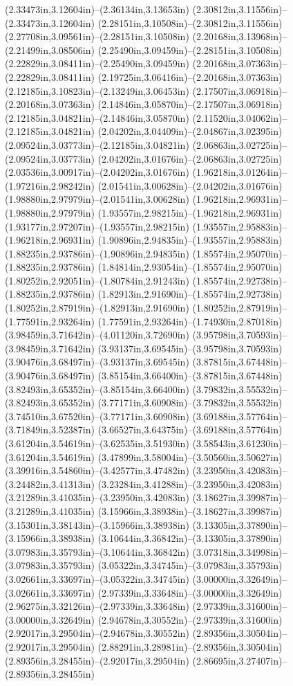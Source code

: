 (2.33473in,3.12604in)--(2.36134in,3.13653in) (2.30812in,3.11556in)--(2.33473in,3.12604in) (2.28151in,3.10508in)--(2.30812in,3.11556in) (2.27708in,3.09561in)--(2.28151in,3.10508in) (2.20168in,3.13968in)--(2.21499in,3.08506in) (2.25490in,3.09459in)--(2.28151in,3.10508in) (2.22829in,3.08411in)--(2.25490in,3.09459in) (2.20168in,3.07363in)--(2.22829in,3.08411in) (2.19725in,3.06416in)--(2.20168in,3.07363in) (2.12185in,3.10823in)--(2.13249in,3.06453in) (2.17507in,3.06918in)--(2.20168in,3.07363in) (2.14846in,3.05870in)--(2.17507in,3.06918in) (2.12185in,3.04821in)--(2.14846in,3.05870in) (2.11520in,3.04062in)--(2.12185in,3.04821in) (2.04202in,3.04409in)--(2.04867in,3.02395in) (2.09524in,3.03773in)--(2.12185in,3.04821in) (2.06863in,3.02725in)--(2.09524in,3.03773in) (2.04202in,3.01676in)--(2.06863in,3.02725in) (2.03536in,3.00917in)--(2.04202in,3.01676in) (1.96218in,3.01264in)--(1.97216in,2.98242in) (2.01541in,3.00628in)--(2.04202in,3.01676in) (1.98880in,2.97979in)--(2.01541in,3.00628in) (1.96218in,2.96931in)--(1.98880in,2.97979in) (1.93557in,2.98215in)--(1.96218in,2.96931in) (1.93177in,2.97207in)--(1.93557in,2.98215in) (1.93557in,2.95883in)--(1.96218in,2.96931in) (1.90896in,2.94835in)--(1.93557in,2.95883in) (1.88235in,2.93786in)--(1.90896in,2.94835in) (1.85574in,2.95070in)--(1.88235in,2.93786in) (1.84814in,2.93054in)--(1.85574in,2.95070in) (1.80252in,2.92051in)--(1.80784in,2.91243in) (1.85574in,2.92738in)--(1.88235in,2.93786in) (1.82913in,2.91690in)--(1.85574in,2.92738in) (1.80252in,2.87919in)--(1.82913in,2.91690in) (1.80252in,2.87919in)--(1.77591in,2.93264in) (1.77591in,2.93264in)--(1.74930in,2.87018in) (3.98459in,3.71642in)--(4.01120in,3.72690in) (3.95798in,3.70593in)--(3.98459in,3.71642in) (3.93137in,3.69545in)--(3.95798in,3.70593in) (3.90476in,3.68497in)--(3.93137in,3.69545in) (3.87815in,3.67448in)--(3.90476in,3.68497in) (3.85154in,3.66400in)--(3.87815in,3.67448in) (3.82493in,3.65352in)--(3.85154in,3.66400in) (3.79832in,3.55532in)--(3.82493in,3.65352in) (3.77171in,3.60908in)--(3.79832in,3.55532in) (3.74510in,3.67520in)--(3.77171in,3.60908in) (3.69188in,3.57764in)--(3.71849in,3.52387in) (3.66527in,3.64375in)--(3.69188in,3.57764in) (3.61204in,3.54619in)--(3.62535in,3.51930in) (3.58543in,3.61230in)--(3.61204in,3.54619in) (3.47899in,3.58004in)--(3.50560in,3.50627in) (3.39916in,3.54860in)--(3.42577in,3.47482in) (3.23950in,3.42083in)--(3.24482in,3.41313in) (3.23284in,3.41288in)--(3.23950in,3.42083in) (3.21289in,3.41035in)--(3.23950in,3.42083in) (3.18627in,3.39987in)--(3.21289in,3.41035in) (3.15966in,3.38938in)--(3.18627in,3.39987in) (3.15301in,3.38143in)--(3.15966in,3.38938in) (3.13305in,3.37890in)--(3.15966in,3.38938in) (3.10644in,3.36842in)--(3.13305in,3.37890in) (3.07983in,3.35793in)--(3.10644in,3.36842in) (3.07318in,3.34998in)--(3.07983in,3.35793in) (3.05322in,3.34745in)--(3.07983in,3.35793in) (3.02661in,3.33697in)--(3.05322in,3.34745in) (3.00000in,3.32649in)--(3.02661in,3.33697in) (2.97339in,3.33648in)--(3.00000in,3.32649in) (2.96275in,3.32126in)--(2.97339in,3.33648in) (2.97339in,3.31600in)--(3.00000in,3.32649in) (2.94678in,3.30552in)--(2.97339in,3.31600in) (2.92017in,3.29504in)--(2.94678in,3.30552in) (2.89356in,3.30504in)--(2.92017in,3.29504in) (2.88291in,3.28981in)--(2.89356in,3.30504in) (2.89356in,3.28455in)--(2.92017in,3.29504in) (2.86695in,3.27407in)--(2.89356in,3.28455in) 
